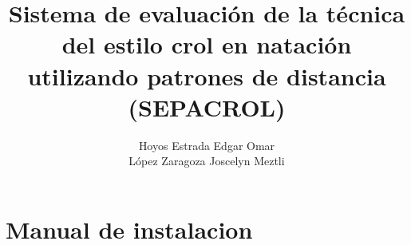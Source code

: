 \documentclass[oneside,11pt,final]{book}
\title{\textbf{Sistema de evaluación de la técnica del estilo crol en natación utilizando patrones de distancia (SEPACROL)}}
\author{Hoyos Estrada Edgar Omar\\
            López Zaragoza Joscelyn Meztli}
\begin{document}
    \frontmatter
    
    \tableofcontents 
    \listoffigures
    \listoftables
    
    \mainmatter

    
    
    \chapter{Manual de instalacion}
    
 
    
    
    
    
    
\end{document}
